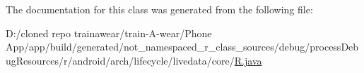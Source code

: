 \begin{DoxyCode}{0}

\end{DoxyCode}


The documentation for this class was generated from the following file\+:\begin{DoxyCompactItemize}
\item 
D\+:/cloned repo trainawear/train-\/\+A-\/wear/\+Phone App/app/build/generated/not\+\_\+namespaced\+\_\+r\+\_\+class\+\_\+sources/debug/process\+Debug\+Resources/r/android/arch/lifecycle/livedata/core/\mbox{\hyperlink{process_debug_resources_2r_2android_2arch_2lifecycle_2livedata_2core_2_r_8java}{R.\+java}}\end{DoxyCompactItemize}
